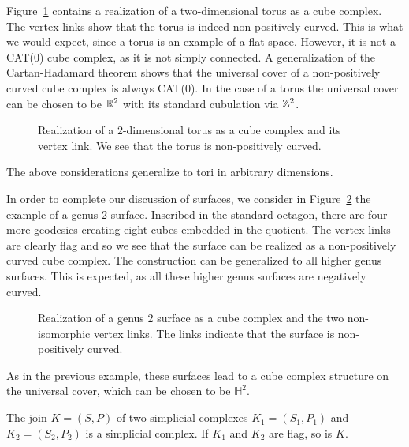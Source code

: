 \begin{bsp}[Torus]
  \label{bsp:ccc-torus}
  Figure~\ref{fig:torus} contains a realization of a two-dimensional torus as a cube complex. The vertex links show that the torus is indeed non-positively curved. This is what we would expect, since a torus is an example of a flat space. However, it is not a CAT(0) cube complex, as it is not simply connected. A generalization of the Cartan-Hadamard theorem shows that the universal cover of a non-positively curved cube complex is always CAT(0). In the case of a torus the universal cover can be chosen to be \(\mathbb{R}^2\) with its standard cubulation via \(\mathbb{Z}^2\).
  \begin{figure}[htbp]
    \centering
    
    \caption{Realization of a 2-dimensional torus as a cube complex and its vertex link. We see that the torus is non-positively curved.}
    \label{fig:torus}
  \end{figure}

  The above considerations generalize to tori in arbitrary dimensions.
\end{bsp}
\begin{bsp}
  \label{bsp:ccc-genus-2}
  In order to complete our discussion of surfaces, we consider in Figure~\ref{fig:genus-2} the example of a genus 2 surface. Inscribed in the standard octagon, there are four more geodesics creating eight cubes embedded in the quotient. The vertex links are clearly flag and so we see that the surface can be realized as a non-positively curved cube complex. The construction can be generalized to all higher genus surfaces. This is expected, as all these higher genus surfaces are negatively curved.
  \begin{figure}[htbp]
    \centering
    
    \caption{Realization of a genus 2 surface as a cube complex and the two non-isomorphic vertex links. The links indicate that the surface is non-positively curved.}
    \label{fig:genus-2}
  \end{figure}

  As in the previous example, these surfaces lead to a cube complex structure on the universal cover, which can be chosen to be \(\mathbb{H}^2\).
\end{bsp}

\begin{lemma}
  \label{lem:flag}
  The join \(K = (S,P)\) of two simplicial complexes \(K_1 = (S_1, P_1)\) and \(K_2 = (S_2, P_2)\) is a simplicial complex. If \(K_1\) and \(K_2\) are flag, so is \(K\).
\end{lemma}

